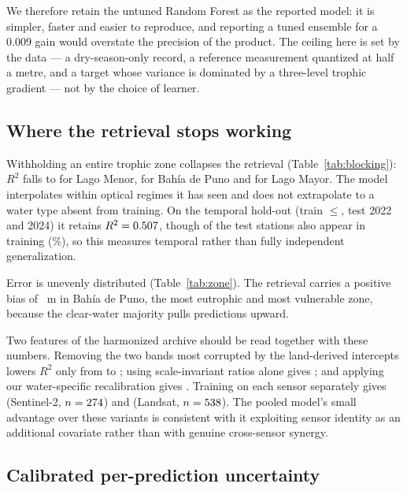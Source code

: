 \documentclass[preprint,review,12pt,authoryear]{elsarticle}
\begin{document}
We therefore retain the untuned Random Forest as the reported model: it is
simpler, faster and easier to reproduce, and reporting a tuned ensemble for a
0.009 gain would overstate the precision of the product. The ceiling here is
set by the data --- a dry-season-only record, a reference measurement
quantized at half a metre, and a target whose variance is dominated by a
three-level trophic gradient --- not by the choice of learner.



\subsection{Where the retrieval stops working}

Withholding an entire trophic zone collapses the retrieval
(Table~\ref{tab:blocking}): $R^2$ falls to \numZoneoutMenorRTwo{} for Lago
Menor, \numZoneoutPunoRTwo{} for Bah\'ia de Puno and \numZoneoutMayorRTwo{}
for Lago Mayor. The model interpolates within optical regimes it has seen and
does not extrapolate to a water type absent from training. On the temporal
hold-out (train $\le$\numTemporalCut, test 2022 and 2024) it retains
$R^2=0.507$, though \numTemporalShared{} of the
\numTemporalTestStations{} test stations also appear in training
(\numTemporalOverlapPct\%), so this measures temporal rather than fully
independent generalization.

Error is unevenly distributed (Table~\ref{tab:zone}). The retrieval carries a
positive bias of \numZoneBahiaDePunoBias~m in Bah\'ia de Puno, the most
eutrophic and most vulnerable zone, because the clear-water majority pulls
predictions upward.



Two features of the harmonized archive should be read together with these
numbers. Removing the two bands most corrupted by the land-derived intercepts
lowers $R^2$ only from \numHeadlineRTwo{} to \numVisibleRTwo; using
scale-invariant ratios alone gives \numRatiosRTwo; and applying our
water-specific recalibration gives \numLocalReharmRTwo. Training on each
sensor separately gives \numSTwoOnlyRTwo{} (Sentinel-2, $n=274$)
and \numLsOnlyRTwo{} (Landsat, $n=538$). The pooled model's small
advantage over these variants is consistent with it exploiting sensor
identity as an additional covariate rather than with genuine cross-sensor
synergy.

\subsection{Calibrated per-prediction uncertainty}
\end{document}
